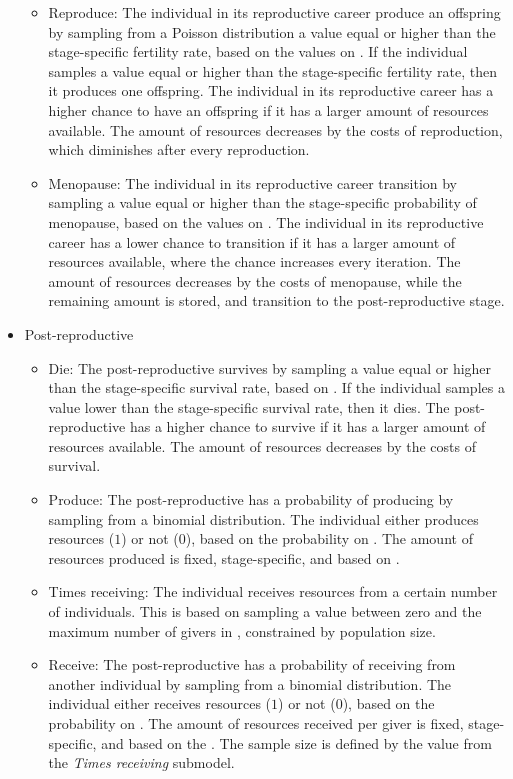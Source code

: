 \documentclass{article}
\begin{document}
\begin{itemize}
\begin{itemize}
        \item Reproduce: The individual in its reproductive career produce an offspring by sampling from a Poisson distribution a value equal or higher than the stage-specific fertility rate, based on the values on \citep{wood2017dynamics}. If the individual samples a value equal or higher than the stage-specific fertility rate, then it produces one offspring. The individual in its reproductive career has a higher chance to have an offspring if it has a larger amount of resources available. The amount of resources decreases by the costs of reproduction, which diminishes after every reproduction.
        \item Menopause: The individual in its reproductive career transition by sampling a value equal or higher than the stage-specific probability of menopause, based on the values on \citep{laisk2019demographic}. The individual in its reproductive career has a lower chance to transition if it has a larger amount of resources available, where the chance increases every iteration. The amount of resources decreases by the costs of menopause, while the remaining amount is stored, and transition to the post-reproductive stage.
    \end{itemize}
    \item Post-reproductive
    \begin{itemize}
        \item Die: The post-reproductive survives by sampling a value equal or higher than the stage-specific survival rate, based on \cite{gurven2007longevity}. If the individual samples a value lower than the stage-specific survival rate, then it dies. The post-reproductive has a higher chance to survive if it has a larger amount of resources available. The amount of resources decreases by the costs of survival.
        \item Produce: The post-reproductive has a probability of producing by sampling from a binomial distribution. The individual either produces resources ($1$) or not ($0$), based on the probability on \cite{koster2020life}. The amount of resources produced is fixed, stage-specific, and based on \cite{koster2020life}.
        \item Times receiving: The individual receives resources from a certain number of individuals. This is based on sampling a value between zero and the maximum number of givers in \cite{gurven2004give}, constrained by population size.
        \item Receive: The post-reproductive has a probability of receiving from another individual by sampling from a binomial distribution. The individual either receives resources ($1$) or not ($0$), based on the probability on \cite{gurven2004give}. The amount of resources received per giver is fixed, stage-specific, and based on the \cite{gurven2004give}. The sample size is defined by the value from the \emph{Times receiving} submodel. 

\end{itemize}
\end{itemize}
\end{document}
